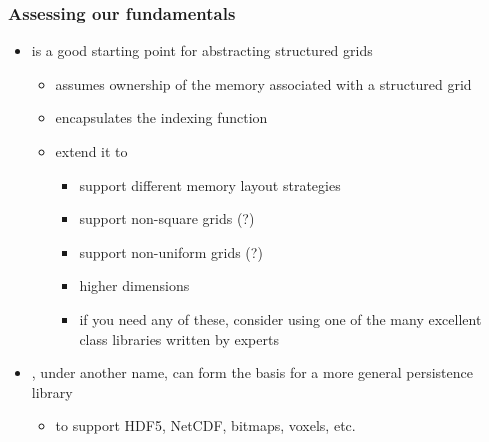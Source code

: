 \begin{frame}[fragile]
%
  \frametitle{Assessing our fundamentals}
%
  \begin{itemize}
%
  \item {} is a good starting point for abstracting structured grids
    \begin{itemize}
    \item assumes ownership of the memory associated with a structured grid
    \item encapsulates the indexing function
    \item extend it to
      \begin{itemize}
      \item support different memory layout strategies
      \item support non-square grids (?)
      \item support non-uniform grids (?)
      \item higher dimensions
      \item if you need any of these, consider using one of the many excellent class libraries
        written by experts
      \end{itemize}
    \end{itemize}
%
  \item {}, under another name, can form the basis for a more general
    persistence library
    \begin{itemize}
    \item to support HDF5, NetCDF, bitmaps, voxels, etc.
    \end{itemize}
%
  \end{itemize}
%
\end{frame}

